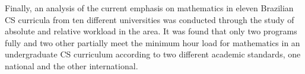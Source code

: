 \documentclass[conference]{IEEEtran}
\begin{document}
	Finally, an analysis of the current emphasis on mathematics in eleven Brazilian CS curricula from ten different universities was conducted through the study of absolute and relative workload in the area. It was found that only two programs fully and two other partially meet the minimum hour load for mathematics in an undergraduate CS curriculum according to two different academic standards, one national and the other international.
	
%
%



%
%
\end{document}

